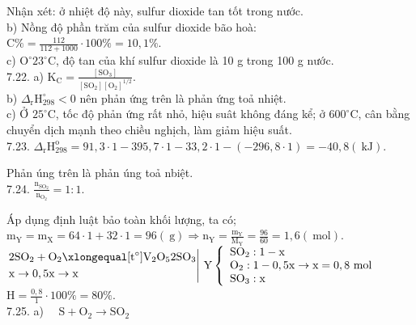 \documentclass[10pt]{article}
\begin{document}
Nhận xét: ở nhiệt độ này, sulfur dioxide tan tốt trong nước.\\
b) Nồng độ phần trăm của sulfur dioxide bão hoà:\\
$\mathrm{C} \%=\frac{112}{112+1000} \cdot 100 \%=10,1 \%$.\\
c) $\mathrm{O}^{\circ} 23^{\circ} \mathrm{C}$, độ tan của khí sulfur dioxide là 10 g trong 100 g nước.\\
7.22. a) $\mathrm{K}_{\mathrm{C}}=\frac{\left[\mathrm{SO}_{3}\right]}{\left[\mathrm{SO}_{2}\right]\left[\mathrm{O}_{2}\right]^{1 / 2}}$.\\
b) $\Delta_{\mathrm{r}} \mathrm{H}_{298}^{\circ}<0$ nên phản ứng trên là phản ứng toả nhiệt.\\
c) Ở $25^{\circ} \mathrm{C}$, tốc độ phản ứng rất nhỏ, hiệu suât không đáng kể; ở $600^{\circ} \mathrm{C}$, cân bằng chuyển dịch mạnh theo chiều nghịch, làm giảm hiệu suất.\\
7.23. $\Delta_{\mathrm{r}} \mathrm{H}_{298}^{\mathrm{o}}=91,3 \cdot 1-395,7 \cdot 1-33,2 \cdot 1-(-296,8 \cdot 1)=-40,8(\mathrm{~kJ})$.

Phản úng trên là phản úng toả nbiệt.\\
7.24. $\frac{\mathrm{n}_{\mathrm{SO}_{2}}}{\mathrm{n}_{\mathrm{O}_{2}}}=1: 1$.

Áp dụng định luật bảo toàn khối lượng, ta có;\\
$\mathrm{m}_{\mathrm{Y}}=\mathrm{m}_{\mathrm{X}}=64 \cdot 1+32 \cdot 1=96(\mathrm{~g}) \Rightarrow \mathrm{n}_{\mathrm{Y}}=\frac{\mathrm{m}_{\mathrm{Y}}}{\mathrm{M}_{\mathrm{Y}}}=\frac{96}{60}=1,6(\mathrm{~mol})$.\\
$\left.\begin{aligned} & 2 \mathrm{SO}_{2}+\mathrm{O}_{2} \xlongequal[\mathrm{t}^{\circ}]{\mathrm{V}_{2} \mathrm{O}_{5}} 2 \mathrm{SO}_{3} \\ & \mathrm{x} \rightarrow 0,5 \mathrm{x} \rightarrow \mathrm{x}\end{aligned} \right\rvert\, \mathrm{Y}\left\{\begin{array}{l}\mathrm{SO}_{2}: 1-\mathrm{x} \\ \mathrm{O}_{2}: 1-0,5 \mathrm{x} \rightarrow \mathrm{x}=0,8 \mathrm{~mol} \\ \mathrm{SO}_{3}: \mathrm{x}\end{array}\right.$\\
$\mathrm{H}=\frac{0,8}{1} \cdot 100 \%=80 \%$.\\
7.25. a) $\quad \mathrm{S}+\mathrm{O}_{2} \longrightarrow \mathrm{SO}_{2}$
\end{document}
